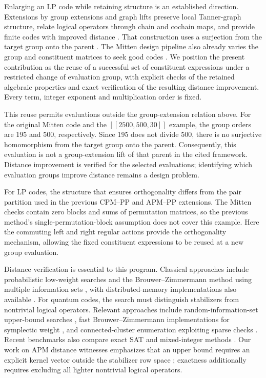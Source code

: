 \documentclass[12pt]{article}
\begin{document}
Enlarging an LP code while retaining structure is an established direction.
Extensions by group extensions and graph lifts preserve local Tanner-graph
structure, relate logical operators through chain and cochain maps, and
provide finite codes with improved distance \cite{lifting}.
That construction uses a surjection from the target group onto the parent
\cite[Sec.~II.1]{lifting}. The Mitten design pipeline also already varies
the group and constituent matrices to seek good codes \cite{mitten}.
We position the present contribution as the reuse of a successful set of
constituent expressions under a restricted change of evaluation group,
with explicit checks of the retained algebraic properties and exact
verification of the resulting distance improvement. Every term, integer
exponent and multiplication order is fixed.

This reuse permits evaluations outside the group-extension relation above.
For the original Mitten code and the $[[2500,500,30]]$ example, the group
orders are 195 and 500, respectively. Since 195 does not divide 500,
there is no surjective homomorphism from the target group onto the parent.
Consequently, this evaluation is not a group-extension lift of that parent
in the cited framework. Distance improvement is verified for the selected evaluations; identifying
which evaluation groups improve distance remains a design problem.

For LP codes, the structure that ensures orthogonality differs from the
pair partition used in the previous CPM--PP and APM--PP extensions.
The Mitten checks contain zero blocks and sums of permutation matrices,
so the previous method's single-permutation-block assumption does not
cover this example. Here the commuting left and right regular actions
provide the orthogonality mechanism, allowing the fixed constituent
expressions to be reused at a new group evaluation.

Distance verification is essential to this program. Classical approaches
include probabilistic low-weight searches \cite{leon,stern} and the
Brouwer--Zimmermann method using multiple information sets
\cite{grassl,lisonek}, with distributed-memory implementations also
available \cite{parallelbz}. For quantum codes, the search must distinguish
stabilizers from nontrivial logical operators. Relevant approaches include
random-information-set upper-bound searches \cite{qdistrnd}, fast
Brouwer--Zimmermann implementations for symplectic weight \cite{quantumbz},
and connected-cluster enumeration exploiting sparse checks \cite{clusters}.
Recent benchmarks also compare exact SAT and mixed-integer methods
\cite{distancebench}. Our work on APM distance witnesses emphasizes that
an upper bound requires an explicit kernel vector outside the stabilizer
row space \cite{apmwitness}; exactness additionally requires excluding
all lighter nontrivial logical operators.
\end{document}
